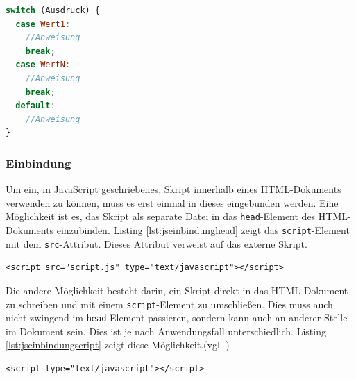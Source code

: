 \vspace{1em}
\begin{lstlisting}[language=JavaScript, caption=Syntax \texttt{switch}-Anweisung, label=lst:jssyntaxswitch]
switch (Ausdruck) {
  case Wert1:
    //Anweisung
    break;
  case WertN:
    //Anweisung
    break;
  default:
    //Anweisung
}
\end{lstlisting}

\subsubsection{Einbindung} Um ein, in JavaScript geschriebenes, Skript innerhalb eines HTML-Dokuments verwenden zu können, muss es erst einmal in dieses eingebunden werden. Eine Möglichkeit ist es, das Skript als separate Datei in das \texttt{head}-Element des HTML-Dokuments einzubinden. Listing \ref{lst:jseinbindunghead} zeigt das \texttt{script}-Element mit dem \texttt{src}-Attribut. Dieses Attribut verweist auf das externe Skript.

\vspace{1em}
\begin{lstlisting}[language=HTML5, caption=JavaScript Einbindung als separate Datei im \texttt{head}-Element, label=lst:jseinbindunghead]
<script src="script.js" type="text/javascript"></script>
\end{lstlisting}

Die andere Möglichkeit besteht darin, ein Skript direkt in das HTML-Dokument zu schreiben und mit einem \texttt{script}-Element zu umschließen. Dies muss auch nicht zwingend im \texttt{head}-Element passieren, sondern kann auch an anderer Stelle im Dokument sein. Dies ist je nach Anwendungsfall unterschiedlich. Listing \ref{lst:jseinbindungscript} zeigt diese Möglichkeit.(vgl. \cite[S.47]{AntoEinf2014})

\vspace{1em}
\begin{lstlisting}[language=HTML5, caption=JavaScript Einbindung in \texttt{script}-Element, label=lst:jseinbindungscript]
<script type="text/javascript"></script>
\end{lstlisting}

